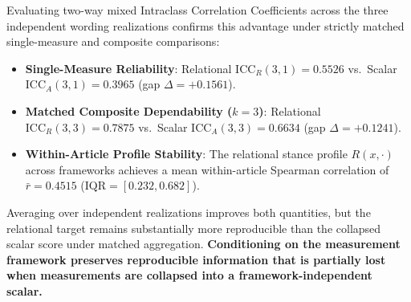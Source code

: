Evaluating two-way mixed Intraclass Correlation Coefficients across the three independent wording realizations confirms this advantage under strictly matched single-measure and composite comparisons:
\begin{itemize}
    \item \textbf{Single-Measure Reliability}: Relational $\mathrm{ICC}_R(3,1) = \mathbf{0.5526}$ vs.\ Scalar $\mathrm{ICC}_A(3,1) = 0.3965$ (gap $\Delta = \mathbf{+0.1561}$).
    \item \textbf{Matched Composite Dependability ($k=3$)}: Relational $\mathrm{ICC}_R(3,3) = \mathbf{0.7875}$ vs.\ Scalar $\mathrm{ICC}_A(3,3) = 0.6634$ (gap $\Delta = \mathbf{+0.1241}$).
    \item \textbf{Within-Article Profile Stability}: The relational stance profile $R(x, \cdot)$ across frameworks achieves a mean within-article Spearman correlation of $\bar{r} = \mathbf{0.4515}$ ($\mathrm{IQR} = [0.232, 0.682]$).
\end{itemize}
Averaging over independent realizations improves both quantities, but the relational target remains substantially more reproducible than the collapsed scalar score under matched aggregation. \textbf{Conditioning on the measurement framework preserves reproducible information that is partially lost when measurements are collapsed into a framework-independent scalar.}

